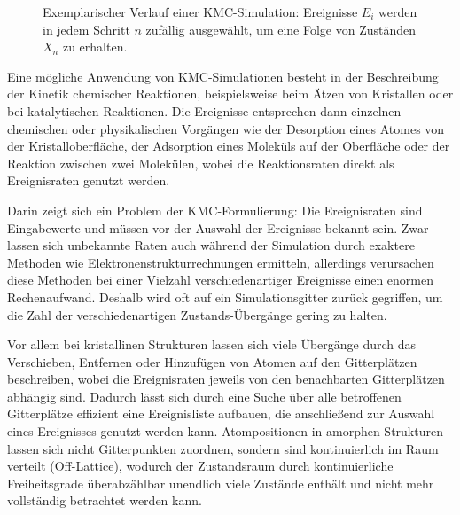 \begin{figure}
  \centering

  \def\svgwidth{14cm}
  

  \caption[Exemplarischer Verlauf einer KMC-Simulation]{
    Exemplarischer Verlauf einer KMC-Simulation:
    Ereignisse $E_i$ werden in jedem Schritt $n$ zufällig ausgewählt, um eine Folge von Zuständen $X_n$ zu erhalten.
  }

  \label{fig:kmctree}
\end{figure}

Eine mögliche Anwendung von KMC-Simulationen besteht in der Beschreibung der Kinetik chemischer Reaktionen, beispielsweise beim Ätzen von Kristallen\cite{gosalvez_atomistic_2008} oder bei katalytischen Reaktionen\cite{stamatakis_unraveling_2012}.
Die Ereignisse entsprechen dann einzelnen chemischen oder physikalischen Vorgängen wie der Desorption eines Atomes von der Kristalloberfläche, der Adsorption eines Moleküls auf der Oberfläche oder der Reaktion zwischen zwei Molekülen, wobei die Reaktionsraten direkt als Ereignisraten genutzt werden.

Darin zeigt sich ein Problem der KMC-Formulierung:
Die Ereignisraten sind Eingabewerte und müssen vor der Auswahl der Ereignisse bekannt sein.
Zwar lassen sich unbekannte Raten auch während der Simulation durch exaktere Methoden wie Elektronenstrukturrechnungen ermitteln, allerdings verursachen diese Methoden bei einer Vielzahl verschiedenartiger Ereignisse einen enormen Rechenaufwand.
Deshalb wird oft auf ein Simulationsgitter zurück gegriffen, um die Zahl der verschiedenartigen Zustands-Übergänge gering zu halten.

Vor allem bei kristallinen Strukturen lassen sich viele Übergänge durch das Verschieben, Entfernen oder Hinzufügen von Atomen auf den Gitterplätzen beschreiben, wobei die Ereignisraten jeweils von den benachbarten Gitterplätzen abhängig sind.
Dadurch lässt sich durch eine Suche über alle betroffenen Gitterplätze effizient eine Ereignisliste aufbauen, die anschließend zur Auswahl eines Ereignisses genutzt werden kann.
Atompositionen in amorphen Strukturen lassen sich nicht Gitterpunkten zuordnen, sondern sind kontinuierlich im Raum verteilt (Off-Lattice), wodurch der Zustandsraum durch kontinuierliche Freiheitsgrade überabzählbar unendlich viele Zustände enthält und nicht mehr vollständig betrachtet werden kann.

